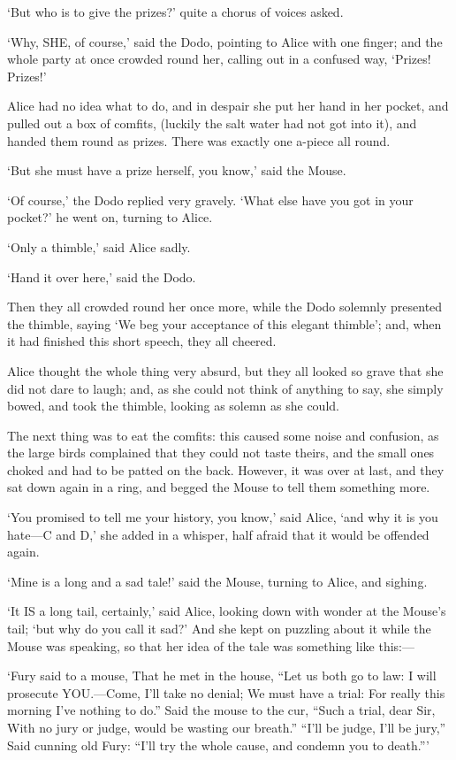 \documentclass[12pt]{article}
\begin{document}
\begin{Parallel}[p]{}{}
{‘But who is to give the prizes?’ quite a chorus of voices asked.

‘Why, SHE, of course,’ said the Dodo, pointing to Alice with one finger; and the whole party at once crowded round her, calling out in a confused way, ‘Prizes! Prizes!’

Alice had no idea what to do, and in despair she put her hand in her pocket, and pulled out a box of comfits, (luckily the salt water had not got into it), and handed them round as prizes. There was exactly one a-piece all round.

‘But she must have a prize herself, you know,’ said the Mouse.

‘Of course,’ the Dodo replied very gravely. ‘What else have you got in your pocket?’ he went on, turning to Alice.

‘Only a thimble,’ said Alice sadly.

‘Hand it over here,’ said the Dodo.

Then they all crowded round her once more, while the Dodo solemnly presented the thimble, saying ‘We beg your acceptance of this elegant thimble’; and, when it had finished this short speech, they all cheered.

Alice thought the whole thing very absurd, but they all looked so grave that she did not dare to laugh; and, as she could not think of anything to say, she simply bowed, and took the thimble, looking as solemn as she could.

The next thing was to eat the comfits: this caused some noise and confusion, as the large birds complained that they could not taste theirs, and the small ones choked and had to be patted on the back. However, it was over at last, and they sat down again in a ring, and begged the Mouse to tell them something more.

‘You promised to tell me your history, you know,’ said Alice, ‘and why it is you hate—C and D,’ she added in a whisper, half afraid that it would be offended again.

‘Mine is a long and a sad tale!’ said the Mouse, turning to Alice, and sighing.

‘It IS a long tail, certainly,’ said Alice, looking down with wonder at the Mouse’s tail; ‘but why do you call it sad?’ And she kept on puzzling about it while the Mouse was speaking, so that her idea of the tale was something like this:—

         ‘Fury said to a
         mouse, That he
        met in the
       house,
     “Let us
      both go to
       law: I will
        prosecute
         YOU.—Come,
           I’ll take no
           denial; We
          must have a
        trial: For
      really this
     morning I’ve
    nothing
    to do.”
     Said the
      mouse to the
       cur, “Such
        a trial,
         dear Sir,
            With
          no jury
        or judge,
       would be
      wasting
      our
      breath.”
       “I’ll be
        judge, I’ll
         be jury,”
            Said
         cunning
          old Fury:
          “I’ll
          try the
            whole
            cause,
              and
           condemn
           you
          to
           death.”’


}
\end{Parallel}
\end{document}
